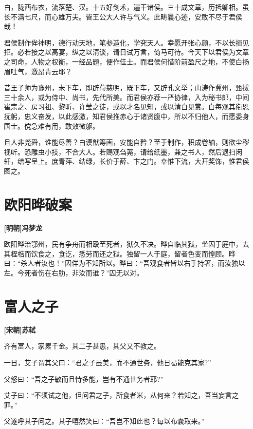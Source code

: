 \documentclass[UTF8,titlepage,oneside]{ctexbook}
\begin{document}
白，陇西布衣，流落楚、汉。十五好剑术，遍干诸侯。三十成文章，历抵卿相。虽长不满七尺，而心雄万夫。皆王公大人许与气义。此畴曩心迹，安敢不尽于君侯哉！

君侯制作侔神明，德行动天地，笔参造化，学究天人。幸愿开张心颜，不以长揖见拒。必若接之以高宴，纵之以清谈，请日试万言，倚马可待。今天下以君侯为文章之司命，人物之权衡，一经品题，便作佳士。而君侯何惜阶前盈尺之地，不使白扬眉吐气，激昂青云耶？

昔王子师为豫州，未下车，即辟荀慈明，既下车，又辟孔文举；山涛作冀州，甄拔三十余人，或为侍中、尚书，先代所美。而君侯亦荐一严协律，入为秘书郎，中间崔宗之、房习祖、黎昕、许莹之徒，或以才名见知，或以清白见赏。白每观其衔恩抚躬，忠义奋发，以此感激，知君侯推赤心于诸贤腹中，所以不归他人，而愿委身国士。傥急难有用，敢效微躯。

且人非尧舜，谁能尽善？白谟猷筹画，安能自矜？至于制作，积成卷轴，则欲尘秽视听。恐雕虫小技，不合大人。若赐观刍荛，请给纸墨，兼之书人，然后退扫闲轩，缮写呈上。庶青萍、结绿，长价于薛、卞之门。幸惟下流，大开奖饰，惟君侯图之。


\chapter*{欧阳晔破案}
\begin{center}
	\textbf{[明朝]冯梦龙}
\end{center}

欧阳晔治鄂州，民有争舟而相殴至死者，狱久不决。晔自临其狱，坐囚于庭中，去其桎梏而饮食之，食讫，悉劳而还之狱。独留一人于庭，留者色变而惶顾。晔曰：“杀人者汝也！”囚佯为不知所以。晔曰：“吾观食者皆以右手持箸，而汝独以左。今死者伤在右肋，非汝而谁？”囚无以对。


\chapter*{富人之子}
\begin{center}
	\textbf{[宋朝]苏轼}
\end{center}

齐有富人，家累千金。其二子甚愚，其父又不教之。

一日，艾子谓其父曰：“君之子虽美，而不通世务，他日曷能克其家?”

父怒曰：“吾之子敏而且恃多能，岂有不通世务者耶?”

艾子曰：“不须试之他，但问君之子，所食者米，从何来？若知之，吾当妄言之罪。”

父遂呼其子问之。其子嘻然笑曰：“吾岂不知此也？每以布囊取来。”
\end{document}
